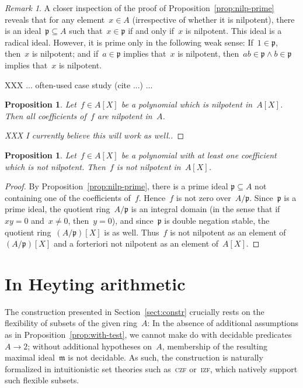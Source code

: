 \documentclass[oneside,reqno]{amsart}
\theoremstyle{definition}
\theoremstyle{plain}
\newtheorem{prop}[defn]{Proposition}
\theoremstyle{remark}
\newtheorem{rem}[defn]{Remark}
\newcommand{\mmm}{\mathfrak{m}}
\newcommand{\ppp}{\mathfrak{p}}
\renewcommand{\_}{\mathpunct{.}\,}
\begin{document}
\begin{rem}A closer inspection of the proof of
Proposition~\ref{prop:nilp-prime} reveals that for any element~$x \in A$
(irrespective of whether it is nilpotent), there is an ideal~$\ppp \subseteq A$
such that~$x \in \ppp$ if and only if~$x$ is nilpotent. This ideal is a radical ideal. However, it is
prime only in the following weak sense: If~$1 \in \ppp$, then~$x$ is nilpotent;
and if~$a \in \ppp$ implies that~$x$ is nilpotent, then~$ab \in \ppp \wedge b
\in \ppp$ implies that~$x$ is nilpotent.
\end{rem}

XXX ... often-used case study (cite ...) ...

\begin{prop}Let~$f \in A[X]$ be a polynomial which is nilpotent in~$A[X]$. Then
all coefficients of~$f$ are nilpotent in~$A$.
\end{prop}

\begin{proof}[XXX I currently believe this will work as well.]
\end{proof}

\begin{prop}\label{prop:nilp-coefficients}Let~$f \in A[X]$ be a polynomial with at least one coefficient
which is not nilpotent. Then~$f$ is not nilpotent in~$A[X]$.
\end{prop}

\begin{proof}By Proposition~\ref{prop:nilp-prime}, there is a prime ideal
$\ppp \subseteq A$ not containing one of the coefficients of~$f$. Hence~$f$ is
not zero over~$A/\ppp$. Since~$\ppp$ is a prime ideal, the quotient
ring~$A/\ppp$ is an integral domain (in the sense that if~$xy = 0$ and~$x \neq
0$, then~$y = 0$), and since~$\ppp$ is double negation stable, the quotient ring~$(A/\ppp)[X]$ is as well. Thus~$f$ is not nilpotent
as an element of~$(A/\ppp)[X]$ and a forteriori not nilpotent as an element
of~$A[X]$.\end{proof}


\section{In Heyting arithmetic}
\label{sect:arithmetization}

The construction presented in Section~\ref{sect:constr} crucially rests on the
flexibility of subsets of the given ring~$A$: In the absence of additional
assumptions as in Proposition~\ref{prop:with-test},
we cannot make do with decidable
predicates~$A \to 2$; without additional hypotheses on~$A$, membership of the
resulting maximal ideal~$\mmm$ is not decidable. As such, the construction is
naturally formalized in intuitionistic set theories such as~\textsc{czf}
or~\textsc{izf}, which natively support such flexible subsets.
\end{document}
